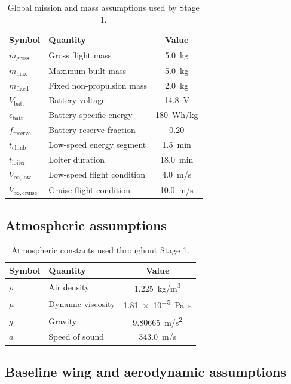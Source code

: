 \documentclass[11pt]{article}
\begin{document}
\begin{table}[h]
\centering
\begin{tabular}{llc}
\toprule
Symbol & Quantity & Value \\
\midrule
\(m_{\mathrm{gross}}\) & Gross flight mass & \SI{5.0}{kg} \\
\(m_{\max}\) & Maximum built mass & \SI{5.0}{kg} \\
\(m_{\mathrm{fixed}}\) & Fixed non-propulsion mass & \SI{2.0}{kg} \\
\(V_{\mathrm{batt}}\) & Battery voltage & \SI{14.8}{V} \\
\(\epsilon_{\mathrm{batt}}\) & Battery specific energy & \SI{180}{Wh/kg} \\
\(f_{\mathrm{reserve}}\) & Battery reserve fraction & 0.20 \\
\(t_{\mathrm{climb}}\) & Low-speed energy segment & \SI{1.5}{min} \\
\(t_{\mathrm{loiter}}\) & Loiter duration & \SI{18.0}{min} \\
\(V_{\infty,\mathrm{low}}\) & Low-speed flight condition & \SI{4.0}{m/s} \\
\(V_{\infty,\mathrm{cruise}}\) & Cruise flight condition & \SI{10.0}{m/s} \\
\bottomrule
\end{tabular}
\caption{Global mission and mass assumptions used by Stage 1.}
\end{table}

\subsection{Atmospheric assumptions}

\begin{table}[h]
\centering
\begin{tabular}{llc}
\toprule
Symbol & Quantity & Value \\
\midrule
\(\rho\) & Air density & \SI{1.225}{kg/m^3} \\
\(\mu\) & Dynamic viscosity & \SI{1.81e-5}{Pa.s} \\
\(g\) & Gravity & \SI{9.80665}{m/s^2} \\
\(a\) & Speed of sound & \SI{343.0}{m/s} \\
\bottomrule
\end{tabular}
\caption{Atmospheric constants used throughout Stage 1.}
\end{table}

\subsection{Baseline wing and aerodynamic assumptions}
\end{document}
